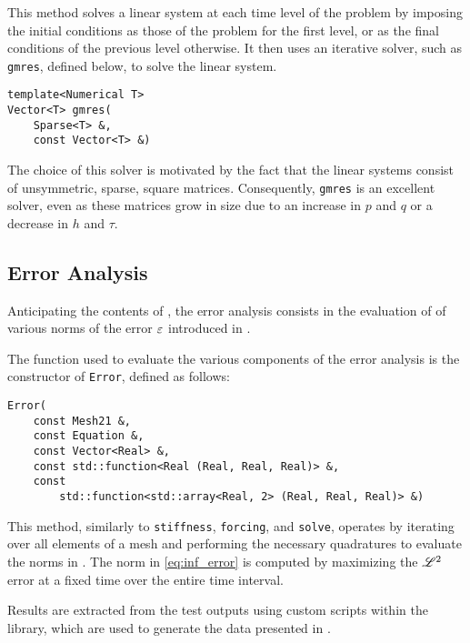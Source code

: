 This method solves a linear system at each time level of the problem by imposing the initial conditions as those of the problem for the first level, or as the final conditions of the previous level otherwise. It then uses an iterative solver, such as \lstinline{gmres}, defined below, to solve the linear system.

\begin{lstlisting}[style=cpp]
template<Numerical T>
Vector<T> gmres(
    Sparse<T> &,
    const Vector<T> &)
\end{lstlisting}

The choice of this solver is motivated by the fact that the linear systems consist of unsymmetric, sparse, square matrices. Consequently, \lstinline{gmres} is an excellent solver, even as these matrices grow in size due to an increase in $p$ and $q$ or a decrease in $h$ and $\tau$.

\newpage
\subsection{Error Analysis}

Anticipating the contents of , the error analysis consists in the evaluation of of various norms of the error $\varepsilon$ introduced in .

The function used to evaluate the various components of the error analysis is the constructor of \lstinline{Error}, defined as follows:
\begin{lstlisting}[style=cpp]
Error(
    const Mesh21 &, 
    const Equation &, 
    const Vector<Real> &, 
    const std::function<Real (Real, Real, Real)> &, 
    const 
        std::function<std::array<Real, 2> (Real, Real, Real)> &)
\end{lstlisting}

This method, similarly to \lstinline{stiffness}, \lstinline{forcing}, and \lstinline{solve}, operates by iterating over all elements of a mesh and performing the necessary quadratures to evaluate the norms in . The norm in \cref{eq:inf_error} is computed by maximizing the $\mathscr{L}^{2}$ error at a fixed time over the entire time interval.

Results are extracted from the test outputs using custom scripts within the library, which are used to generate the data presented in .